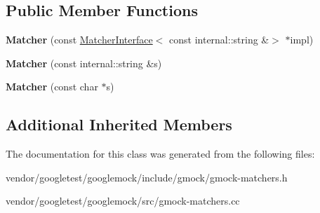\subsection*{Public Member Functions}
\begin{DoxyCompactItemize}
\item 
\mbox{\label{classtesting_1_1_matcher_3_01const_01internal_1_1string_01_6_4_aa35956335ee37d048c49945b904c1fb9}} 
{\bfseries Matcher} (const \mbox{\hyperlink{classtesting_1_1_matcher_interface}{Matcher\+Interface}}$<$ const internal\+::string \&$>$ $\ast$impl)
\item 
\mbox{\label{classtesting_1_1_matcher_3_01const_01internal_1_1string_01_6_4_a5014c9227335b575a1c0167b9c609bf8}} 
{\bfseries Matcher} (const internal\+::string \&s)
\item 
\mbox{\label{classtesting_1_1_matcher_3_01const_01internal_1_1string_01_6_4_accc8b69db530a019efa2a1d6436eb3db}} 
{\bfseries Matcher} (const char $\ast$s)
\end{DoxyCompactItemize}
\subsection*{Additional Inherited Members}


The documentation for this class was generated from the following files\+:\begin{DoxyCompactItemize}
\item 
vendor/googletest/googlemock/include/gmock/gmock-\/matchers.\+h\item 
vendor/googletest/googlemock/src/gmock-\/matchers.\+cc\end{DoxyCompactItemize}
